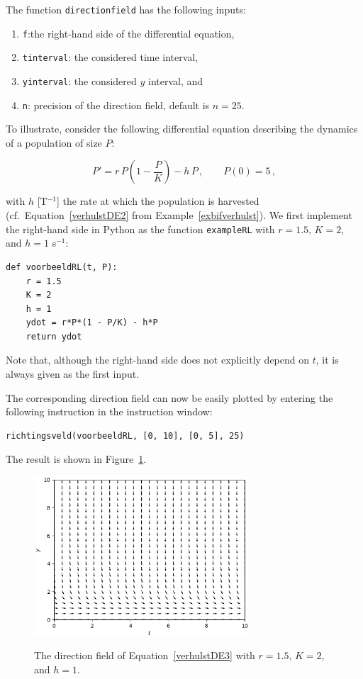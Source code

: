 The function \texttt{directionfield} has the following inputs:
\begin{enumerate}
	\item \texttt{f}:the right-hand side of the differential equation,
	\item \texttt{tinterval}: the considered time interval,
	\item \texttt{yinterval}: the considered $y$ interval, and
	\item \texttt{n}: precision of the direction field, default is $n = 25$.
\end{enumerate}
To illustrate, consider the following differential equation describing the dynamics of a population of size $P$:

\begin{equation}\label{verhulstDE3}
P' = r\,P\left(1-\dfrac{P}{K}\right) - h\,P\,, \qquad P(0) = 5\,,
\end{equation}

with $h$ [T$^{-1}$] the rate at which the population is harvested (cf.\ Equation~\eqref{verhulstDE2} from Example~\ref{exbifverhulst}). We first implement the right-hand side in Python as the function \texttt{exampleRL} with $r = 1.5$, $K = 2$, and $h = 1$ s$^{-1}$:
\begin{lstlisting}
def voorbeeldRL(t, P):
    r = 1.5
    K = 2
    h = 1
    ydot = r*P*(1 - P/K) - h*P
    return ydot
\end{lstlisting}

Note that, although the right-hand side does not explicitly depend on $t$, it is always given as the first input.

The corresponding direction field can now be easily plotted by entering the following instruction in the instruction window:
\begin{lstlisting}
richtingsveld(voorbeeldRL, [0, 10], [0, 5], 25)
\end{lstlisting}

The result is shown in Figure~\ref{fig:voorbeeldRV}.

\begin{figure}[ht]
\centering
\includegraphics[width=8cm]{richtingsveldVB.png}\\
\caption{The direction field of Equation\ \eqref{verhulstDE3} with $r = 1.5$, $K = 2$, and $h = 1$.\label{fig:voorbeeldRV}}
\end{figure}

